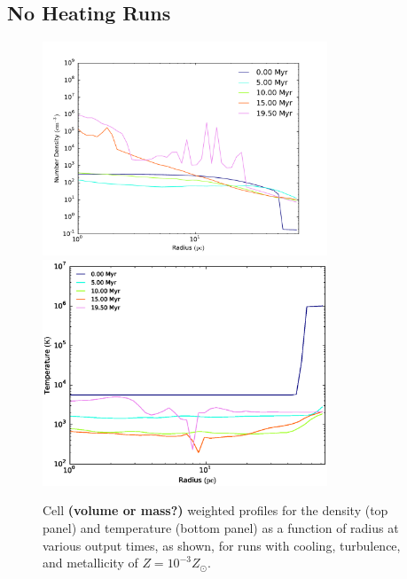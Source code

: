 \documentclass[useAMS,usenatbib]{mn2e}
\begin{document}
\subsection{No Heating Runs}

\begin{figure}
\begin{center}
\includegraphics[width=8.5cm]{Images/density_series-eps-converted-to}
\includegraphics[width=8.5cm]{Images/temperature_series}
\end{center}
\caption{\label{fig:profile_turbulence} Cell {\bf (volume or mass?)} weighted profiles for 
the density (top panel) and temperature (bottom panel) as a function of radius at various 
output times, as shown, for runs with cooling, turbulence, and metallicity of $Z=10^{-3}Z_\odot$.}
\end{figure}
\end{document}
